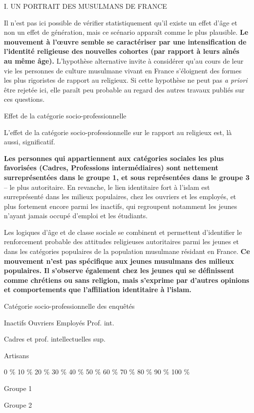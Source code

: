 I. UN PORTRAIT DES MUSULMANS DE FRANCE

Il n'est pas ici possible de vérifier statistiquement qu'il existe un
effet d'âge et non un effet de génération, mais ce scénario apparaît
comme le plus plausible. \textbf{Le mouvement à l'œuvre semble se
caractériser par une intensification de l'identité religieuse des
nouvelles cohortes (par rapport à leurs aînés au même âge).} L'hypothèse
alternative invite à considérer qu'au cours de leur vie les personnes de
culture musulmane vivant en France s'éloignent des formes les plus
rigoristes de rapport au religieux. Si cette hypothèse ne peut pas
\emph{a priori} être rejetée ici, elle paraît peu probable au regard des
autres travaux publiés sur ces questions.


Effet de la catégorie socio-professionnelle


L'effet de la catégorie socio-professionnelle sur le rapport au
religieux est, là aussi, significatif.

\textbf{Les personnes qui appartiennent aux catégories sociales les plus
favorisées (Cadres, Professions intermédiaires) sont nettement
surreprésentées dans le groupe 1, et sous représentées dans le groupe 3}
-- le plus autoritaire. En revanche, le lien identitaire fort à l'islam
est surreprésenté dans les milieux populaires, chez les ouvriers et les
employés, et plus fortement encore parmi les inactifs, qui regroupent
notamment les jeunes n'ayant jamais occupé d'emploi et les étudiants.

Les logiques d'âge et de classe sociale se combinent et permettent
d'identifier le renforcement probable des attitudes religieuses
autoritaires parmi les jeunes et dans les catégories populaires de la
population musulmane résidant en France. \textbf{Ce mouvement n'est pas
spécifique aux jeunes musulmans des milieux populaires. Il s'observe
également chez les jeunes qui se définissent comme chrétiens ou sans
religion, mais s'exprime par d'autres opinions et comportements que
l'affiliation identitaire à l'islam.}


Catégorie socio-professionnelle des enquêtés


Inactifs Ouvriers Employés Prof. int.


Cadres et prof. intellectuelles sup.

Artisans


0 \% 10 \% 20 \% 30 \% 40 \% 50 \% 60 \% 70 \% 80 \% 90 \% 100 \%


Groupe 1


Groupe 2

